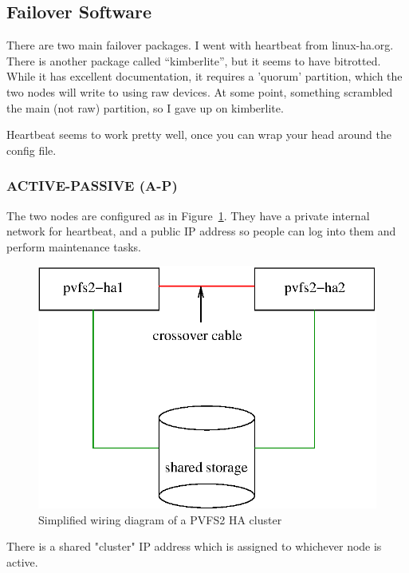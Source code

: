 \documentclass[11pt]{article}
\begin{document}
\subsection{Failover Software}

There are two main failover packages.  I went with heartbeat from
linux-ha.org.  There is another package called ``kimberlite'', but it
seems to have bitrotted.  While it has excellent documentation, it
requires a 'quorum' partition, which the two nodes will write to using
raw devices.  At some point, something scrambled the main (not raw)
partition, so I gave up on kimberlite.  

Heartbeat seems to work pretty well, once you can wrap your head around
the config file.


\subsubsection{ACTIVE-PASSIVE (A-P)}

The two nodes are configured as in Figure~\ref{fig:nodes}.  They have a
private internal network for heartbeat, and a public IP address so
people can log into them and perform maintenance tasks.

\begin{figure}
\begin{center}
\includegraphics[scale=0.75]{pvfs2-failover.eps}
\end{center}
\caption{Simplified wiring diagram of a PVFS2 HA cluster}
\label{fig:nodes}
\end{figure}

There is a shared "cluster" IP address which is assigned to whichever
node is active. 
\end{document}
